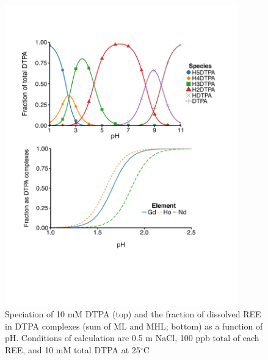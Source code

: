 \begin{figure}[htbp]\
\begin{center}
\includegraphics[width = 0.9\textwidth]{REE-aq-chem-figs/DTPA-model-figs-comb.pdf}		
\caption[Speciation of DTPA and the fraction of DTPA-associated, dissolved REE as a function of pH.]{Speciation of 10 mM DTPA (top) and the fraction of dissolved REE in DTPA complexes (sum of ML and MHL; bottom) as a function of pH.
Conditions of calculation are 0.5 m NaCl, 100 ppb total of each REE, and 10 mM total DTPA at 25$^\circ$C}
\label{fig:REE-spec-exp}
\end{center}
\end{figure}



